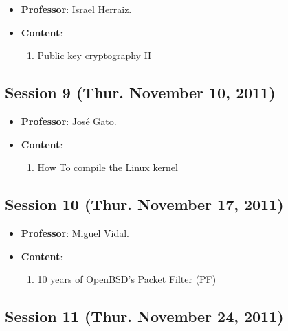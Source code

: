 \documentclass[a4paper]{article}
\begin{document}
\begin{itemize}
 \item \textbf{Professor}: Israel Herraiz.

 \item \textbf{Content}:

 \begin{enumerate}
  \item Public key cryptography II
 \end{enumerate}

\end{itemize}

\subsection{Session 9 (Thur. November 10, 2011)}

\begin{itemize}
 \item \textbf{Professor}: José Gato.

 \item \textbf{Content}:

 \begin{enumerate}
  \item How To compile the Linux kernel
 \end{enumerate}

\end{itemize}

\subsection{Session 10 (Thur. November 17, 2011)}

\begin{itemize}
 \item \textbf{Professor}: Miguel Vidal.

 \item \textbf{Content}:

 \begin{enumerate}
  \item 10 years of OpenBSD's Packet Filter (PF)
 \end{enumerate}

\end{itemize}

\subsection{Session 11 (Thur. November 24, 2011)}
\end{document}
